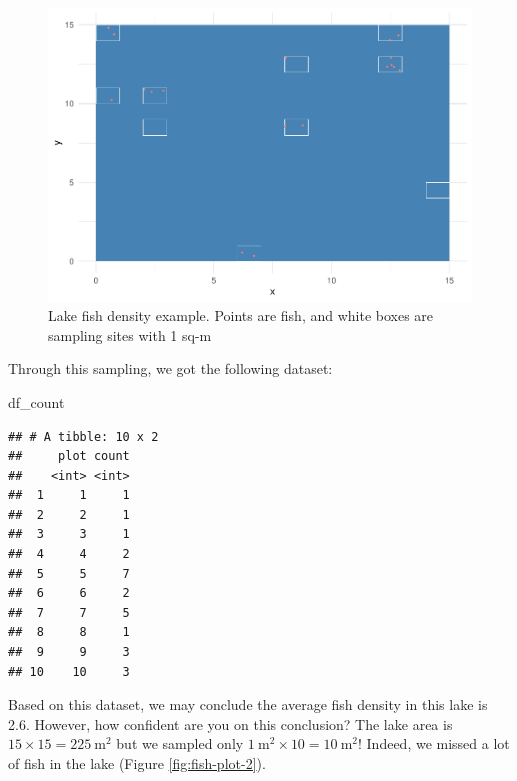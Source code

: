 \documentclass[
]{book}
\newenvironment{Shaded}{\begin{snugshade}}{\end{snugshade}}
\newcommand{\NormalTok}[1]{#1}
\begin{document}
\begin{figure}

{\centering \includegraphics{_main_files/figure-latex/fish-plot-1} 

}

\caption{Lake fish density example. Points are fish, and white boxes are sampling sites with 1 sq-m}\label{fig:fish-plot}
\end{figure}

Through this sampling, we got the following dataset:

\begin{Shaded}
\begin{Highlighting}[]
\NormalTok{df\_count}
\end{Highlighting}
\end{Shaded}

\begin{verbatim}
## # A tibble: 10 x 2
##     plot count
##    <int> <int>
##  1     1     1
##  2     2     1
##  3     3     1
##  4     4     2
##  5     5     7
##  6     6     2
##  7     7     5
##  8     8     1
##  9     9     3
## 10    10     3
\end{verbatim}

Based on this dataset, we may conclude the average fish density in this lake is 2.6. However, how confident are you on this conclusion? The lake area is \(15 \times 15 = 225~\text{m}^2\) but we sampled only \(1~\text{m}^2 \times 10 = 10~\text{m}^2\)! Indeed, we missed a lot of fish in the lake (Figure \ref{fig:fish-plot-2}).
\end{document}
